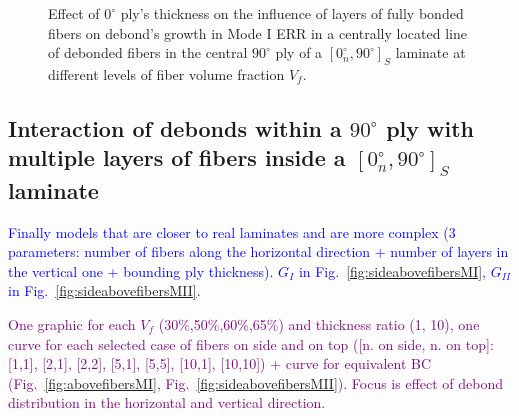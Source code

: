 \documentclass[review]{elsarticle}
\begin{document}
\begin{figure}[!h]
\caption{Effect of $0^{\circ}$ ply's thickness on the influence of layers of fully bonded fibers on debond's growth in Mode I ERR in a centrally located line of debonded fibers in the central $90^{\circ}$ ply of a $\left[0^{\circ}_{n}, 90^{\circ}\right]_{S}$ laminate at different levels of fiber volume fraction $V_{f}$.}\label{fig:abovefibersthicknessMII}
\end{figure}

\subsection{Interaction of debonds within a $90^{\circ}$ ply with multiple layers of fibers inside a $\left[0^{\circ}_{n}, 90^{\circ}\right]_{S}$ laminate}

\textcolor{blue}{Finally models that are closer to real laminates and are more complex (3 parameters: number of fibers along the horizontal direction + number of layers in the vertical one +  bounding ply thickness).  $G_{I}$ in Fig.~\ref{fig:sideabovefibersMI}, $G_{II}$ in Fig.~\ref{fig:sideabovefibersMII}.}

\textcolor{purple}{One graphic for each $V_{f}$ (30\%,50\%,60\%,65\%) and thickness ratio (1, 10), one curve for each selected case of fibers on side and on top ([n. on side, n. on top]: [1,1], [2,1], [2,2], [5,1], [5,5], [10,1], [10,10]) + curve for equivalent BC (Fig.~\ref{fig:abovefibersMI}, Fig.~\ref{fig:sideabovefibersMII}). Focus is effect of debond distribution in the horizontal and vertical direction.}\\
\end{document}

